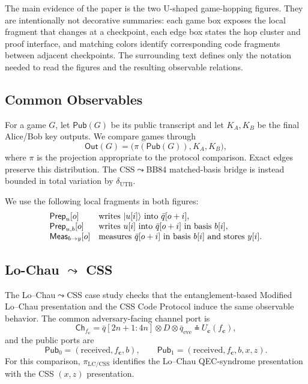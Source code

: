 The main evidence of the paper is the two U-shaped game-hopping figures. They are intentionally not decorative summaries: each game box exposes the local fragment that changes at a checkpoint, each edge box states the hop cluster and proof interface, and matching colors identify corresponding code fragments between adjacent checkpoints. The surrounding text defines only the notation needed to read the figures and the resulting observable relations.

\subsection{Common Observables}

For a game $G$, let $\mathsf{Pub}(G)$ be its public transcript and let $K_A,K_B$ be the final Alice/Bob key outputs. We compare games through
\[
\mathsf{Out}(G)=\bigl(\pi(\mathsf{Pub}(G)),K_A,K_B\bigr),
\]
where $\pi$ is the projection appropriate to the protocol comparison. Exact edges preserve this distribution. The CSS$\leadsto$BB84 matched-basis bridge is instead bounded in total variation by $\delta_{\mathrm{UTB}}$.

We use the following local fragments in both figures:
\[
\begin{array}{@{}ll@{}}
\mathsf{Prep}_{u}[o] &
\text{writes } |u[i]\rangle \text{ into } \bar q[o+i],\\
\mathsf{Prep}_{u,b}[o] &
\text{writes } u[i]\text{ into }\bar q[o+i]\text{ in basis }b[i],\\
\mathsf{Meas}_{b\to y}[o] &
\text{measures }\bar q[o+i]\text{ in basis }b[i]\text{ and stores }y[i].
\end{array}
\]

\subsection{\texorpdfstring{Lo-Chau $\leadsto$ CSS}{Lo-Chau to CSS}}

The Lo--Chau$\leadsto$CSS case study checks that the entanglement-based Modified Lo--Chau presentation and the CSS Code Protocol induce the same observable behavior. The common adversary-facing channel port is
\[
\mathsf{Ch}_{f_{\mathbf c}}
=
\bar q[2n+1{:}4n]\otimes D\otimes\bar q_{\mathrm{eve}}
\asteq U_{\mathbf c}(f_{\mathbf c}),
\]
and the public ports are
\[
\mathsf{Pub}_0=(\mathrm{received},f_{\mathbf c},b),\qquad
\mathsf{Pub}_1=(\mathrm{received},f_{\mathbf c},b,x,z).
\]
For this comparison, $\pi_{\mathrm{LC/CSS}}$ identifies the Lo--Chau QEC-syndrome presentation with the CSS $(x,z)$ presentation.

